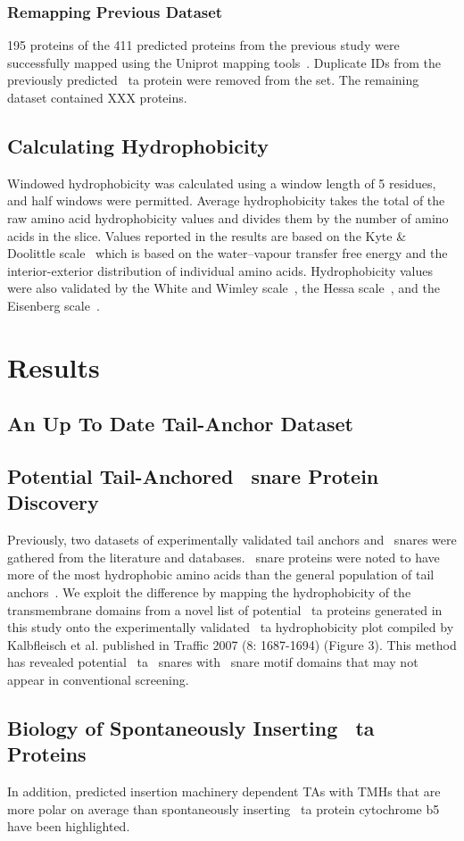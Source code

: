 \subsubsection{Remapping Previous Dataset}
195 proteins of the 411 predicted proteins from the previous study were successfully mapped using the Uniprot mapping tools~\cite{TheUniProtConsortium2014}.
Duplicate IDs from the previously predicted ~\gls{ta} protein were removed from the set.
The remaining dataset contained XXX proteins.

\subsection{Calculating Hydrophobicity}
Windowed hydrophobicity was calculated using a window length of 5 residues, and half windows were permitted.
Average hydrophobicity takes the total of the raw amino acid hydrophobicity values and divides them by the number of amino acids in the slice.
Values reported in the results are based on the Kyte \& Doolittle scale~\cite{Kyte1982} which is based on the water\---vapour transfer free energy and the interior-exterior distribution of individual amino acids.
Hydrophobicity values were also validated by the White and Wimley scale~\cite{White1999}, the Hessa scale~\cite{Hessa2005}, and the Eisenberg scale~\cite{Eisenberg1984}.

\section{Results}

\subsection{An Up To Date Tail-Anchor Dataset}

\subsection{Potential Tail-Anchored ~\gls{snare} Protein Discovery}
Previously, two datasets of experimentally validated tail anchors and ~\gls{snare}s were gathered from the literature and databases.
~\gls{snare} proteins were noted to have more of the most hydrophobic amino acids than the general population of tail anchors~\cite{Kalbfleisch2007}.
We exploit the difference by mapping the hydrophobicity of the transmembrane domains from a novel list of potential ~\gls{ta} proteins generated in this study onto the experimentally validated ~\gls{ta} hydrophobicity plot compiled by Kalbfleisch et al. published in Traffic 2007 (8: 1687-1694) (Figure 3).
This method has revealed potential ~\gls{ta} ~\gls{snare}s with ~\gls{snare} motif domains that may not appear in conventional screening.

\subsection{Biology of Spontaneously Inserting ~\gls{ta} Proteins}
In addition, predicted insertion machinery dependent TAs with TMHs that are more polar on average than spontaneously inserting ~\gls{ta} protein cytochrome b5 have been highlighted.
